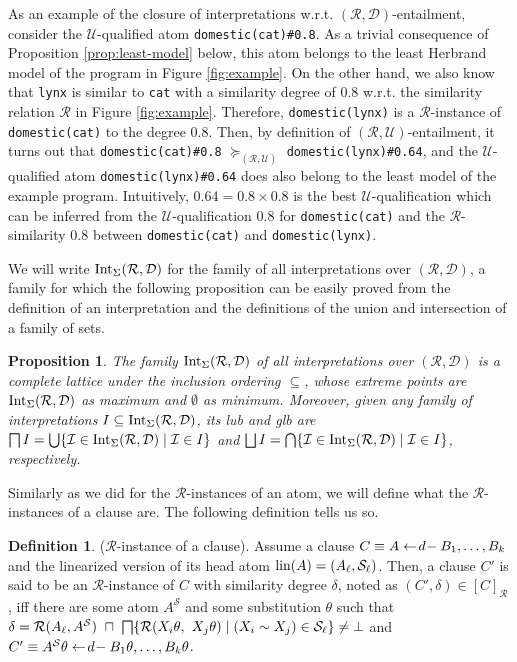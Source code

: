 \documentclass{sigplanconf}
\newcommand{\qdom}{\mathcal{D}} \newcommand{\dqdom}{D \setminus \{\bot\}} \newcommand{\bqdom}{(D \setminus \{\bot\}) \uplus \{?\}}
\newcommand{\U}{\mathcal{U}}
\newcommand{\Set}{\mathcal{S}}
\newcommand{\simrel}{\mathcal{R}}
\theoremstyle{definition}
\newtheorem{definition}{Definition}
\theoremstyle{plain}
\newtheorem{proposition}{Proposition}
\begin{document}
As an example of the closure of interpretations w.r.t. $(\simrel, \qdom)$-entailment, consider the $\U$-qualified atom \texttt{domestic(cat)\#0.8}. As a trivial consequence of Proposition \ref{prop:least-model} below,  this atom belongs to the least Herbrand model of the program in Figure \ref{fig:example}. On the other hand, we also know that  \texttt{lynx} is similar to  \texttt{cat} with a similarity degree of $0.8$ w.r.t. the similarity relation $\simrel$ in Figure \ref{fig:example}. Therefore, \texttt{domestic(lynx)} is a $\simrel$-instance of  \texttt{domestic(cat)} to the degree $0.8$. Then, by definition of $(\simrel, \U)$-entailment, it turns out that \texttt{domestic(cat)\#0.8} $\succcurlyeq_{(\simrel,\U)}$ \texttt{domestic(lynx)\#0.64}, and the $\U$-qualified atom \texttt{domestic(lynx)\#0.64} does also belong to the least model of the example program. Intuitively, $0.64 = 0.8 \times 0.8$ is the best $\U$-qualification which can be inferred from the $\U$-qualification $0.8$ for  \texttt{domestic(cat)} and the $\simrel$-similarity $0.8$ between  \texttt{domestic(cat)} and  \texttt{domestic(lynx)}.

We will write $\intrd$ for the family of all interpretations over $(\simrel,\qdom)$, a family for which the following proposition can be easily proved from the definition of an interpretation and the definitions of the union and intersection of a family of sets.

\begin{proposition}\label{prop:lattice}
The family $\intrd$ of all interpretations over $(\simrel,\qdom)$ is a complete lattice under the inclusion ordering $\subseteq$, whose extreme points are $\intrd$ as maximum and $\emptyset$ as minimum. Moreover, given any family of interpretations $I \subseteq \intrd$, its lub and glb are $\infi I = \union \{\I \in \intrd \mid \I \in I\}$ and $\supr I = \inter \{\I \in \intrd \mid \I \in I\}$, respectively.
\end{proposition}

Similarly as we did for the $\simrel$-instances of an atom, we will define what the $\simrel$-instances of a clause are. The following definition tells us so.

\begin{definition}\label{def:r-instance-clause}
($\simrel$-instance of a clause). Assume a clause $C \equiv A \gets\!d\!- B_1, \ldots, B_k$ and the linearized version of its head atom $\mbox{lin}(A) = (\linear{A}, \linear{\Set})$. Then, a clause $C'$ is said to be an $\simrel$-instance of $C$ with similarity degree $\delta$, noted as $(C',\delta) \in [C]_\simrel$, iff there are some atom $A^\Set$ and some substitution $\theta$ such that $\delta = \simrel(\linear{A}, A^\Set) ~\sqcap~ \infi\{\simrel(X_i\theta,$ $X_j\theta) \mid (X_i \sim X_j) \in \linear{\Set}\} \neq \bot$ and $C' \equiv A^\Set\theta \qgets{d} B_1\theta, \ldots, B_k\theta$.
\end{definition}
\end{document}
